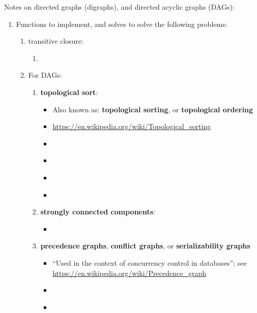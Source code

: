 Notes on directed graphs (digraphs), and directed acyclic graphs (DAGs): \vspace{-0.3cm}
\begin{enumerate} \itemsep -4pt
\item Functions to implement, and solves to solve the following problems: \vspace{-0.3cm}
	\begin{enumerate} \itemsep -2pt
	\item transitive closure: \vspace{-0.2cm}
		\begin{enumerate} \itemsep -2pt
		\item \cite[\S13.4.2]{Goodrich2011}
		\cite[\S14.4]{Goodrich2013}
		\end{enumerate}
	\item For DAGs: \vspace{-0.2cm}
		\begin{enumerate} \itemsep -2pt
		\item {\bf topological sort}: \vspace{-0.1cm}
			\begin{itemize} \itemsep -1pt
			\item Also known as: {\bf topological sorting}, or {\bf topological ordering}
			\item \url{https://en.wikipedia.org/wiki/Topological_sorting}
			\item \cite[\S53.6]{Goldman2008}
			\item \cite[\S22.4]{Cormen2009}
			\item \cite[\S5, pp. 75--80]{Cormen2013}
			\item \cite[\S14.5.1]{Goodrich2013}
			\end{itemize}
		\item {\bf strongly connected components}:
			\begin{itemize}
			\item \cite[\S22.5]{Cormen2009}
			\end{itemize}
		\item {\bf precedence graphs}, {\bf conflict graphs}, or {\bf serializability graphs}
			\begin{itemize}
			\item ``Used in the context of concurrency control in databases''; see \url{https://en.wikipedia.org/wiki/Precedence_graph}
			\item \cite[\S53.6]{Goldman2008}
			\item \cite[\S52.1, pp 844]{Goldman2008}
			\end{itemize}

\end{enumerate}
\end{enumerate}
\end{enumerate}
